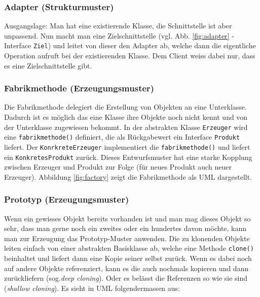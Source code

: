 
\subsubsection{Adapter (Strukturmuster)}
Ausgangslage: Man hat eine existierende Klasse, die Schnittstelle ist aber unpassend. Nun macht man eine Zielschnittstelle (vgl. Abb. \ref{fig:adapter} - Interface \texttt{Ziel}) und leitet von dieser den Adapter ab, welche dann die eigentliche Operation aufruft bei der existierenden Klasse. Dem Client weiss dabei nur, dass es eine Zielschnittstelle gibt.


\newpage

\subsubsection{Fabrikmethode (Erzeugungsmuster)}
Die Fabrikmethode delegiert die Erstellung von Objekten an eine Unterklasse. Dadurch ist es möglich das eine Klasse ihre Objekte noch nicht kennt und von der Unterklasse zugewiesen bekommt. In der abstrakten Klasse \texttt{Erzeuger} wird eine \texttt{fabrikmethode()} definiert, die als Rückgabewert ein Interface \texttt{Produkt} liefert. Der \texttt{KonrkreteErzeuger} implementiert die \texttt{fabrikmethode()} und liefert ein \texttt{KonkretesProdukt} zurück. Dieses Entwurfsmuster hat eine starke Kopplung zwischen Erzeuger und Produkt zur Folge (für neues Produkt auch neuer Erzeuger). Abbildung \ref{fig:factory} zeigt die Fabrikmethode als UML dargestellt.


\subsubsection{Prototyp (Erzeugungsmuster)} 
Wenn ein gewisses Objekt bereits vorhanden ist und man mag dieses Objekt so sehr, dass man gerne noch ein zweites oder ein hundertes davon möchte, kann man zur Erzeugung das Prototyp-Muster anwenden. 
Die zu klonenden Objekte leiten einfach von einer abstrakten Basisklasse ab, welche eine Methode \texttt{clone()} beinhaltet und liefert dann eine Kopie seiner selbst zurück. Wenn es dabei noch auf andere Objekte referenziert, kann es die auch nochmals kopieren und dann zurückliefern (sog.\emph{deep cloning}). Oder es belässt die Referenzen so wie sie sind (\emph{shallow cloning}). Es sieht in UML folgendermassen aus:

